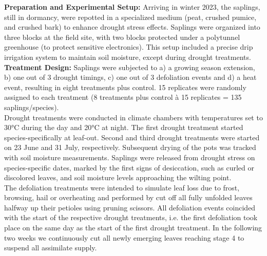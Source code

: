 \documentclass{article}
\begin{document}
	\textbf{Preparation and Experimental Setup:}
	Arriving in winter 2023, the saplings, still in dormancy, were repotted in a specialized medium (peat, crushed pumice, and crushed bark) to enhance drought stress effects. Saplings were organized into three blocks at the field site, with two blocks protected under a polytunnel greenhouse (to protect sensitive electronics). This setup included a precise drip irrigation system to maintain soil moisture, except during drought treatments.\\  
	
\textbf{Treatment Design:}
	Saplings were subjected to a) a growing season extension, b) one out of 3 drought timings, c) one out of 3 defoliation events and d) a heat event, resulting in eight treatments plus control. 15 replicates were randomly assigned to each treatment (8 treatments plus control à 15 replicates = 135 saplings/species). \\  
	Drought treatments were conducted in climate chambers with temperatures set to 30°C during the day and 20°C at night. 
	The first drought treatment started species-specifically at leaf-out. Second and third drought treatments were started on 23 June and 31 July, respectively. Subsequent drying of the pots was tracked with soil moisture measurements. Saplings were released from drought stress on species-specific dates, marked by the first signs of desiccation, such as curled or discolored leaves, and soil moisture levels approaching the wilting point. \\
	The defoliation treatments were intended to simulate leaf loss due to frost, browsing, hail or overheating and performed by cut off all fully unfolded leaves halfway up their petioles using pruning scissors. 
	All defoliation events coincided with the start of the respective drought treatments, i.e. the first defoliation took place on the same day as the start of the first drought treatment. In the following two weeks we continuously cut all newly emerging leaves reaching stage 4 to suspend all assimilate supply.\\ %
	
\end{document}
